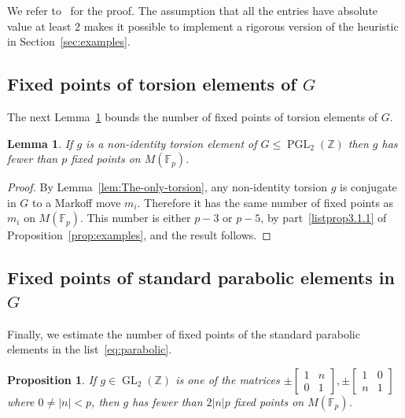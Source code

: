 \documentclass[10pt]{amsart}
\newtheorem{lemm}[theo]{Lemma}\newtheorem{prop}[theo]{Proposition}\newtheorem{coro}[theo]{Corollary}\newtheorem{conj}[theo]{Conjecture}
\theoremstyle{definition}\newtheorem{defi}[theo]{Definition}\newtheorem{rema}[theo]{Remark}\newtheorem{exam}[theo]{Example}\newtheorem{exem}[theo]{Example}\newtheorem{nota}[theo]{Notation}
\newcommand{\Z}{\mathbb{Z}}
\newcommand{\F}{\mathbb{F}}
\DeclareMathOperator{\GL}{GL}
\DeclareMathOperator{\PGL}{PGL}
\begin{document}
We refer to~\cite{CGMP} for the proof. The assumption that all the entries have absolute value at least 2 makes it possible to implement a rigorous version of the heuristic in Section~\ref{sec:examples}.

\goodbreak
\subsection{Fixed points of torsion elements of \texorpdfstring{$G$}{G}}
The next Lemma~\ref{lem:torsion-fix} bounds the number of fixed points of torsion elements of $G$.

\begin{lemm}\label{lem:torsion-fix}
If $g$ is a non-identity torsion element of $G\leq\PGL_{2}(\Z)$ then $g$ has fewer than $p$ fixed points on $M(\F_{p})$.
\end{lemm}


\begin{proof}
By Lemma~\ref{lem:The-only-torsion}, any non-identity torsion $g$ is conjugate in $G$ to a Markoff move $m_{i}$. Therefore it has the same number of fixed points as $m_{i}$ on $M(\F_{p})$. This number is either $p-3$ or $p-5$, by part~\eqref{listprop3.1.1} of Proposition~\ref{prop:examples}, and the result follows.
\end{proof}

\subsection{Fixed points of standard parabolic elements in \texorpdfstring{$G$}{G}}
Finally, we estimate the number of fixed points of the standard parabolic elements in the list~\eqref{eq:parabolic}.

\begin{prop}\label{prop:parabolic}
If $g\in\GL_{2}(\Z)$ is one of the matrices $\pm\left[
\begin{smallmatrix}1 & n\\
0 & 1
\end{smallmatrix}\right],\pm
\left[\begin{smallmatrix}1 & 0\\
n & 1
\end{smallmatrix}\right]$ where $0 \neq |n| < p$, then $g$ has fewer than $2|n|p$ fixed points on $M(\F_{p})$.
\end{prop}
\end{document}
